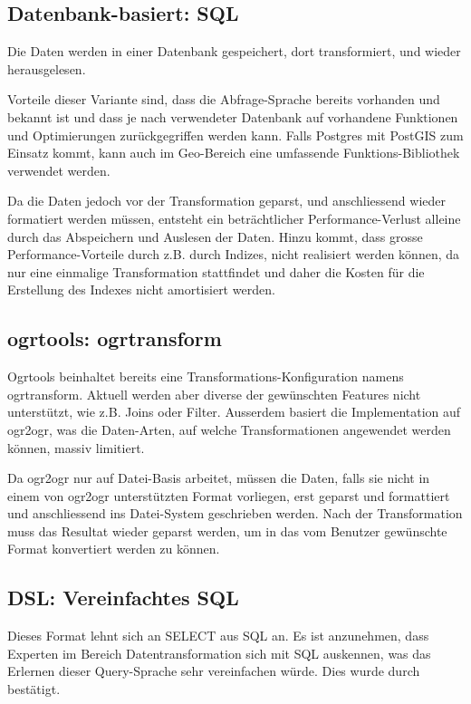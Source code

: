 \subsection{Datenbank-basiert: SQL}
Die Daten werden in einer Datenbank gespeichert, dort transformiert, und wieder herausgelesen.

Vorteile dieser Variante sind, dass die Abfrage-Sprache bereits vorhanden und bekannt ist und dass je nach verwendeter Datenbank auf vorhandene Funktionen und Optimierungen zurückgegriffen werden kann. Falls Postgres mit PostGIS zum Einsatz kommt, kann auch im Geo-Bereich eine umfassende Funktions-Bibliothek verwendet werden. 

Da die Daten jedoch vor der Transformation geparst, und anschliessend wieder formatiert werden müssen, entsteht ein beträchtlicher Performance-Verlust alleine durch das Abspeichern und Auslesen der Daten. Hinzu kommt, dass grosse Performance-Vorteile durch z.B. durch Indizes, nicht realisiert werden können, da nur eine einmalige Transformation stattfindet und daher die Kosten für die Erstellung des Indexes nicht amortisiert werden.

\subsection{ogrtools: ogrtransform}
Ogrtools beinhaltet bereits eine Transformations-Konfiguration namens ogrtransform. Aktuell werden aber diverse der gewünschten Features nicht unterstützt, wie z.B. Joins oder Filter. Ausserdem basiert die Implementation auf ogr2ogr, was die Daten-Arten, auf welche Transformationen angewendet werden können, massiv limitiert.

Da ogr2ogr nur auf Datei-Basis arbeitet, müssen die Daten, falls sie nicht in einem von ogr2ogr unterstützten Format vorliegen, erst geparst und formattiert und anschliessend ins Datei-System geschrieben werden. Nach der Transformation muss das Resultat wieder geparst werden, um in das vom Benutzer gewünschte Format konvertiert werden zu können. 

\subsection{DSL: Vereinfachtes SQL}
Dieses Format lehnt sich an SELECT aus SQL an. Es ist anzunehmen, dass Experten im Bereich Datentransformation sich mit SQL auskennen, was das Erlernen dieser Query-Sprache sehr vereinfachen würde. Dies wurde durch \prof bestätigt. 

